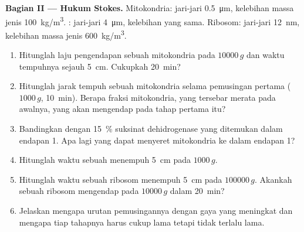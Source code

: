 \begin{problem}
\medskip
\noindent\textbf{Bagian II --- Hukum Stokes.}
Mitokondria: jari-jari \qty{0.5}{\micro m}, kelebihan massa jenis
\qty{100}{kg/m^3}. : jari-jari \qty{4}{\micro m}, kelebihan yang
sama. Ribosom: jari-jari \qty{12}{nm}, kelebihan massa jenis
\qty{600}{kg/m^3}.
\begin{enumerate}[resume]
  \item Hitunglah laju pengendapan sebuah mitokondria pada
        $\num{10000}\,g$ dan waktu tempuhnya sejauh \qty{5}{cm}.
        Cukupkah \qty{20}{min}?
  \item Hitunglah jarak tempuh sebuah mitokondria selama pemusingan
        pertama ($1000\,g$, \qty{10}{min}). Berapa fraksi mitokondria,
        yang tersebar merata pada awalnya, yang akan mengendap pada
        tahap pertama itu?
  \item Bandingkan dengan \qty{15}{\%} suksinat dehidrogenase yang
        ditemukan dalam endapan 1. Apa lagi yang dapat menyeret
        mitokondria ke dalam endapan 1?
  \item Hitunglah waktu sebuah  menempuh \qty{5}{cm} pada
        $1000\,g$.
  \item Hitunglah waktu sebuah ribosom menempuh \qty{5}{cm} pada
        $\num{100000}\,g$. Akankah sebuah ribosom mengendap pada
        $\num{10000}\,g$ dalam \qty{20}{min}?
  \item Jelaskan mengapa urutan pemusingannya dengan gaya yang
        meningkat dan mengapa tiap tahapnya harus cukup lama tetapi
        tidak terlalu lama.
\end{enumerate}


\end{problem}
